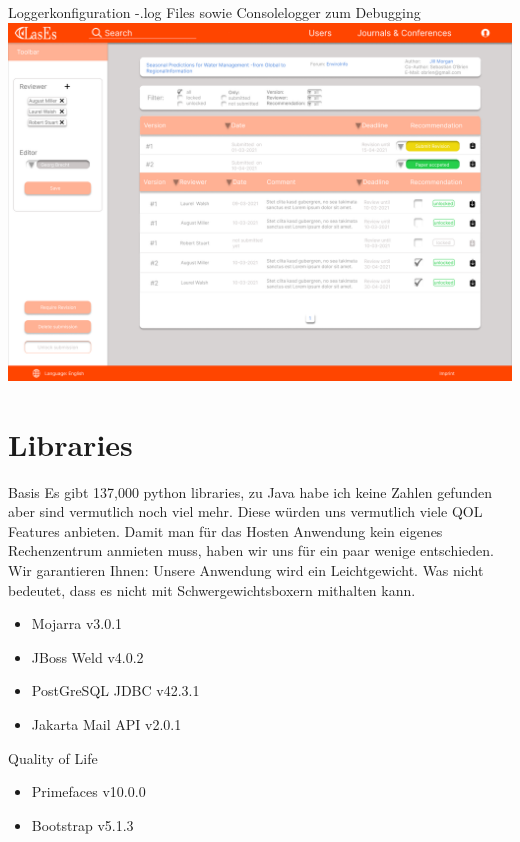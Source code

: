\documentclass{beamer}
\begin{document}
    \begin{frame}{Loggerkonfiguration}
        -.log Files sowie Consolelogger zum Debugging
        \centering
        \includegraphics[height=0.75\textheight]{../../docs/Pflichtenheft/graphics/Submission-png}
    \end{frame}


    \section{Libraries}
    \begin{frame}{Basis}
        Es gibt 137,000 python libraries, zu Java habe ich keine Zahlen gefunden aber sind vermutlich noch viel mehr.
        Diese würden uns vermutlich viele QOL Features anbieten.
        Damit man für das Hosten Anwendung kein eigenes Rechenzentrum anmieten muss, haben wir uns für ein paar wenige entschieden.
        Wir garantieren Ihnen: Unsere Anwendung wird ein Leichtgewicht.
        Was nicht bedeutet, dass es nicht mit Schwergewichtsboxern mithalten kann.
        \begin{itemize}
            \item Mojarra v3.0.1
            \item JBoss Weld v4.0.2
            \item PostGreSQL JDBC v42.3.1
            \item Jakarta Mail API v2.0.1
        \end{itemize}
    \end{frame}

    \begin{frame}{Quality of Life}
        \begin{itemize}
            \item Primefaces v10.0.0
            \item Bootstrap v5.1.3
        \end{itemize}
    \end{frame}
\end{document}
